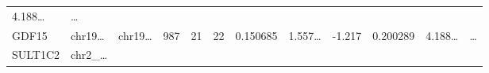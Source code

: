 \documentclass[
]{article}
\begin{document}
\begin{longtable}[]{@{}llllllllllll@{}}
\begin{minipage}[t]{0.09\columnwidth}
4.188\ldots{}\strut
\end{minipage} & \begin{minipage}[t]{0.02\columnwidth}\raggedright
\ldots{}\strut
\end{minipage}\tabularnewline
\begin{minipage}[t]{0.06\columnwidth}\raggedright
GDF15\strut
\end{minipage} & \begin{minipage}[t]{0.06\columnwidth}\raggedright
chr19\ldots{}\strut
\end{minipage} & \begin{minipage}[t]{0.06\columnwidth}\raggedright
chr19\ldots{}\strut
\end{minipage} & \begin{minipage}[t]{0.06\columnwidth}\raggedright
987\strut
\end{minipage} & \begin{minipage}[t]{0.06\columnwidth}\raggedright
21\strut
\end{minipage} & \begin{minipage}[t]{0.06\columnwidth}\raggedright
22\strut
\end{minipage} & \begin{minipage}[t]{0.06\columnwidth}\raggedright
0.150685\strut
\end{minipage} & \begin{minipage}[t]{0.08\columnwidth}\raggedright
1.557\ldots{}\strut
\end{minipage} & \begin{minipage}[t]{0.06\columnwidth}\raggedright
-1.217\strut
\end{minipage} & \begin{minipage}[t]{0.06\columnwidth}\raggedright
0.200289\strut
\end{minipage} & \begin{minipage}[t]{0.09\columnwidth}\raggedright
4.188\ldots{}\strut
\end{minipage} & \begin{minipage}[t]{0.02\columnwidth}\raggedright
\ldots{}\strut
\end{minipage}\tabularnewline
\begin{minipage}[t]{0.06\columnwidth}\raggedright
SULT1C2\strut
\end{minipage} & \begin{minipage}[t]{0.06\columnwidth}\raggedright
chr2\_\ldots{}\strut
\end{minipage} & \begin{minipage}[t]{0.06\columnwidth}\raggedright

\end{minipage}
\end{longtable}
\end{document}
